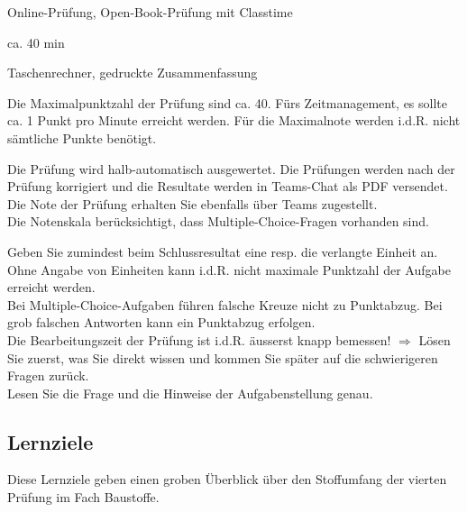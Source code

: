\begin{description}[leftmargin=!,labelwidth=\widthof{Hinweise zur Bearbeitung...},font=\normalfont]
\item [Prüfungsmodus] Online-Prüfung, Open-Book-Prüfung mit Classtime
\item  [Prüfungsdauer] ca. 40 min
\item [Empfohlene Hilfsmittel] Taschenrechner, gedruckte Zusammenfassung
\item [Anzahl Punkte] Die Maximalpunktzahl der Prüfung sind ca. 40.  Fürs Zeitmanagement, es sollte ca. 1 Punkt pro Minute erreicht werden. Für die Maximalnote werden i.d.R. nicht sämtliche Punkte benötigt.
\item [Bewertung] Die Prüfung wird halb-automatisch ausgewertet. Die Prüfungen werden nach der Prüfung korrigiert und die Resultate werden in Teams-Chat als PDF versendet. Die Note der Prüfung erhalten Sie ebenfalls über Teams zugestellt. \\ Die Notenskala berücksichtigt, dass Multiple-Choice-Fragen vorhanden sind.
\item [Hinweise zur Bearbeitung] Geben Sie zumindest beim Schlussresultat eine resp. die verlangte Einheit an. Ohne Angabe von Einheiten kann i.d.R. nicht maximale Punktzahl der Aufgabe erreicht werden. \\ Bei Multiple-Choice-Aufgaben führen falsche Kreuze nicht zu Punktabzug. Bei grob falschen Antworten kann ein Punktabzug erfolgen. \\ Die Bearbeitungszeit der Prüfung ist i.d.R. äusserst knapp bemessen! $\Rightarrow$ Lösen Sie zuerst, was Sie direkt wissen und kommen Sie später auf die schwierigeren Fragen zurück.\\
Lesen Sie die Frage und die Hinweise der Aufgabenstellung genau.
\end{description}


\pagebreak
\subsection*{Lernziele}
Diese Lernziele geben einen groben Überblick über den Stoffumfang der vierten Prüfung im Fach Baustoffe.



%
%
%











